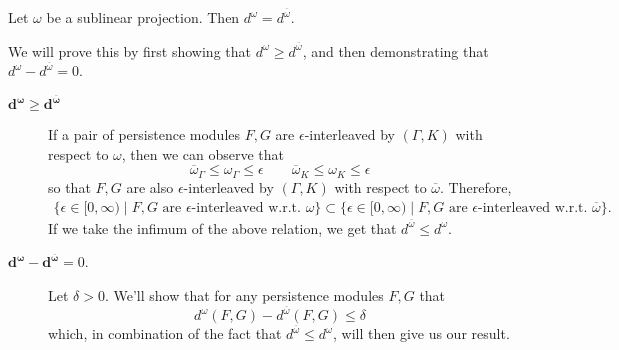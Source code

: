 \begin{proposition}
    Let $\omega$ be a sublinear projection. Then $d^{\omega}= d^{\overline{\omega}}$.
\end{proposition}

\begin{prf}
    We will prove this by first showing that $d^{\omega} \ge d^{\overline{\omega}}$,
    and then demonstrating that $d^{\omega} - d^{\overline{\omega}} = 0$.
    \begin{description}
        \item[$\bm{d^{\omega} \ge d^{\overline{\omega}}}$]
        If a pair of persistence modules $F, G$ are $\epsilon$-interleaved by $(\Gamma, K)$ with respect to $\omega$,
    then we can observe that 
    \[
        \overline{\omega}_\Gamma  \le \omega_\Gamma \le \epsilon \qquad \overline{\omega}_K \le \omega_K \le \epsilon
    \]
    so that $F, G$ are also $\epsilon$-interleaved by $(\Gamma, K)$ with respect to $\overline{\omega}$.
    Therefore,
    \begin{align*}
        \{ \epsilon \in [0, \infty) \mid F, G \text{ are } \epsilon \text{-interleaved w.r.t. } \omega  \}
        \subset 
        \{ \epsilon \in [0, \infty) \mid F, G \text{ are } \epsilon \text{-interleaved w.r.t. } \overline{\omega}  \}.
    \end{align*}
    If we take the infimum of the above relation, we get that $d^{\overline{\omega}} \le d^{\omega}$. \\
    
    \item[$\bm{d^{\omega} - d^{\overline{\omega}}} = 0$.]
    Let $\delta> 0$. We'll show that for any persistence modules $F,G$ that
    \[  
        d^\omega(F,G) - d^{\overline{\omega}}(F,G) \le \delta
    \]
    which, in combination of the fact that $d^{\overline{\omega}} \le d^{\omega}$,
    will then give us our result. 


\end{description}
\end{prf}
